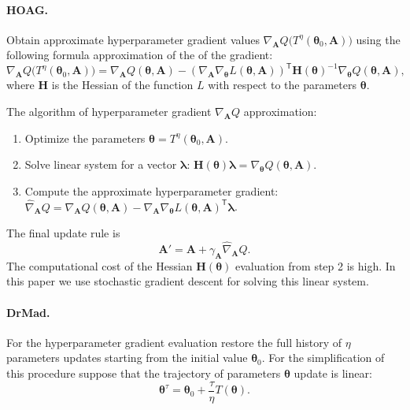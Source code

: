 \documentclass[smallextended]{svjour3}
\begin{document}
\paragraph{HOAG.}
Obtain approximate hyperparameter gradient values  $\nabla_{\mathbf{A}} Q \bigl(T^\eta(\boldsymbol{\theta}_0, \mathbf{A})\bigr)$ using the following  formula approximation of the  of the gradient:
\[
\nabla_{\mathbf{A}} Q \bigl(T^\eta(\boldsymbol{\theta}_0, \mathbf{A})\bigr) = \nabla_{\mathbf{A}} Q(\boldsymbol{\theta}, \mathbf{A}) - (\nabla_{ \mathbf{A}}  \nabla_{\boldsymbol{\theta}} L(\boldsymbol{\theta}, \mathbf{A}))^\mathsf{T}\mathbf{H}(\boldsymbol{\theta})^{-1}\nabla_{\boldsymbol{\theta}} Q(\boldsymbol{\theta}, \mathbf{A}),
\]
where $\mathbf{H}$ is the Hessian of the function $L$ with respect to the parameters $\boldsymbol{\theta}$.

The algorithm of hyperparameter gradient $\nabla_{\mathbf{A}} Q$  approximation:
\begin{enumerate}
\item Optimize the parameters $\boldsymbol{\theta} = T^\eta(\boldsymbol{\theta}_0, \mathbf{A})$.
\item Solve linear system for a vector $\boldsymbol{\lambda}$: $\mathbf{H}(\boldsymbol{\theta})\boldsymbol{\lambda} =  \nabla_{\boldsymbol{\theta}} Q(\boldsymbol{\theta}, \mathbf{A})$.
\item Compute the approximate hyperparameter gradient: $\hat{\nabla}_{\mathbf{A}}Q = \nabla_{\mathbf{A}}Q(\boldsymbol{\theta}, \mathbf{A}) - \nabla_{ \mathbf{A}}  \nabla_{\boldsymbol{\theta}} L(\boldsymbol{\theta}, \mathbf{A})^\mathsf{T}\boldsymbol{\lambda}$.
\end{enumerate}

The final update rule is
\begin{equation}
\label{eq:update_hyper}
\mathbf{A}' = \mathbf{A} + \gamma_{\mathbf{A}} \hat{\nabla}_{\mathbf{A}}Q.
\end{equation}
The computational cost of the Hessian $\mathbf{H}(\boldsymbol{\theta})$ evaluation  from step 2 is high.  In this paper we use stochastic gradient descent for solving this linear system. 


\paragraph{DrMad.}
For the hyperparameter gradient evaluation restore the full history of $\eta$ parameters updates starting from the initial value $\boldsymbol{\theta}_0$.  For the simplification of this procedure suppose that the trajectory of parameters $\boldsymbol{\theta}$ update is linear:
\begin{equation}
\label{eq:mad_lin}
\boldsymbol{\theta}^\tau = \boldsymbol{\theta}_0 + \frac{\tau}{\eta} T(\boldsymbol{\theta}).
\end{equation}
\end{document}
